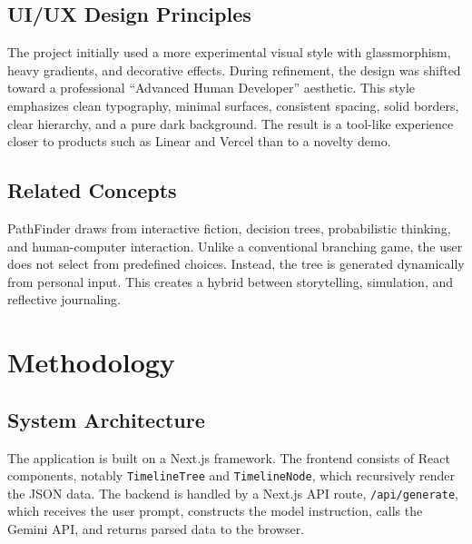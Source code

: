 \documentclass[12pt,a4paper]{report}
\begin{document}
\section{UI/UX Design Principles}
The project initially used a more experimental visual style with glassmorphism, heavy gradients, and decorative effects. During refinement, the design was shifted toward a professional ``Advanced Human Developer'' aesthetic. This style emphasizes clean typography, minimal surfaces, consistent spacing, solid borders, clear hierarchy, and a pure dark background. The result is a tool-like experience closer to products such as Linear and Vercel than to a novelty demo.

\section{Related Concepts}
PathFinder draws from interactive fiction, decision trees, probabilistic thinking, and human-computer interaction. Unlike a conventional branching game, the user does not select from predefined choices. Instead, the tree is generated dynamically from personal input. This creates a hybrid between storytelling, simulation, and reflective journaling.

\chapter{Methodology}

\section{System Architecture}
The application is built on a Next.js framework. The frontend consists of React components, notably \texttt{TimelineTree} and \texttt{TimelineNode}, which recursively render the JSON data. The backend is handled by a Next.js API route, \texttt{/api/generate}, which receives the user prompt, constructs the model instruction, calls the Gemini API, and returns parsed data to the browser.
\end{document}
